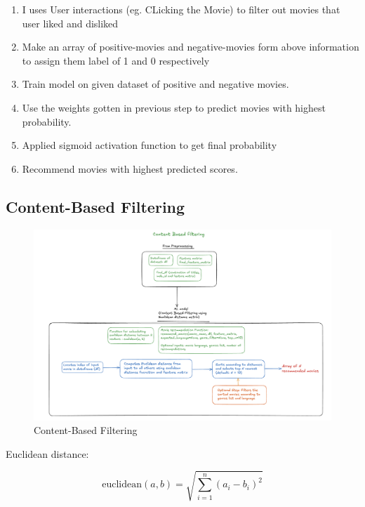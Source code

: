 \documentclass[a4paper]{article}
\theoremstyle{plain}
\begin{document}
\begin{enumerate}
    \item I uses User interactions (eg. CLicking the Movie) to filter out movies that user liked and disliked
    \item Make an array of positive-movies and negative-movies form above information to assign them label of 1 and 0 respectively
    \item Train model on given dataset of positive and negative movies.
    \item Use the weights gotten in previous step to predict movies with highest probability.
    \item Applied sigmoid activation function to get final probability
    \item Recommend movies with highest predicted scores.
\end{enumerate}

\subsection{Content-Based Filtering}
\begin{figure}[H]
    \centering
    \includegraphics[width=\linewidth]{cbf.png}
    \caption{Content-Based Filtering}
    \label{fig:cbf}
\end{figure}
Euclidean distance:

\[
\text{euclidean}(a, b) =  \sqrt{\sum_{i=1}^{n} (a_i - b_i)^2}
\]
\end{document}
